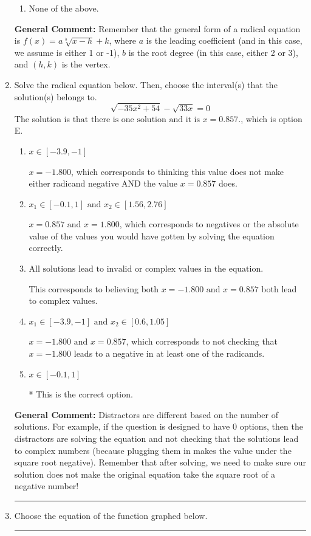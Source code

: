 \documentclass{extbook}[14pt]
\newcommand{\litem}[1]{\item #1

\rule{\textwidth}{0.4pt}}
\begin{document}
\begin{enumerate}
{\begin{enumerate}[label=\Alph*.]
\begin{multicols}{2}
\end{multicols}\item None of the above.\end{enumerate}
\textbf{General Comment:} Remember that the general form of a radical equation is $ f(x) = a \sqrt[b]{x - h} + k $, where $a$ is the leading coefficient (and in this case, we assume is either 1 or -1), $b$ is the root degree (in this case, either 2 or 3), and $(h, k)$ is the vertex.
}
\litem{
Solve the radical equation below. Then, choose the interval(s) that the solution(s) belongs to.
\[ \sqrt{-35 x^2 + 54} - \sqrt{33 x} = 0 \]The solution is \( \text{that there is one solution and it is } x = 0.857. \), which is option E.\begin{enumerate}[label=\Alph*.]
\item \( x \in [-3.9,-1] \)

$x = -1.800$, which corresponds to thinking this value does not make either radicand negative AND the value $x = 0.857$ does.
\item \( x_1 \in [-0.1, 1] \text{ and } x_2 \in [1.56,2.76] \)

$x = 0.857 \text{ and } x = 1.800$, which corresponds to negatives or the absolute value of the values you would have gotten by solving the equation correctly.
\item \( \text{All solutions lead to invalid or complex values in the equation.} \)

This corresponds to believing both $x = -1.800 \text{ and } x = 0.857$ both lead to complex values.
\item \( x_1 \in [-3.9, -1] \text{ and } x_2 \in [0.6,1.05] \)

$x = -1.800 \text{ and } x = 0.857$, which corresponds to not checking that $x = -1.800$ leads to a negative in at least one of the radicands.
\item \( x \in [-0.1,1] \)

* This is the correct option.
\end{enumerate}

\textbf{General Comment:} Distractors are different based on the number of solutions. For example, if the question is designed to have 0 options, then the distractors are solving the equation and not checking that the solutions lead to complex numbers (because plugging them in makes the value under the square root negative). Remember that after solving, we need to make sure our solution does not make the original equation take the square root of a negative number!
}
\litem{
Choose the equation of the function graphed below.

}
\end{enumerate}
\end{document}
